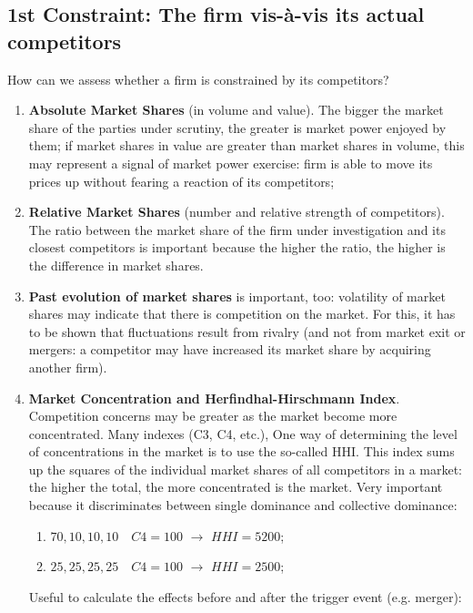     \subsection{1st Constraint: The firm vis-à-vis its actual competitors}

        How can we assess whether a firm is constrained by its competitors?
        \begin{enumerate}
            \item \textbf{Absolute Market Shares} (in volume and value). The bigger the market share of the parties under scrutiny, the greater is market power enjoyed by them; if market shares in value are greater than market shares in volume, this may represent a signal of market power exercise: firm is able to move its prices up without fearing a reaction of its competitors;
            \item \textbf{Relative Market Shares} (number and relative strength of competitors). The ratio between the market share of the firm under investigation and its closest competitors is important because the higher the ratio, the higher is the difference in market shares.
            \item \textbf{Past evolution of market shares} is important, too: volatility of market shares may indicate that there is competition on the market. For this, it has to be shown that fluctuations result from rivalry (and not from market exit or mergers: a competitor may have increased its market share by acquiring another firm).
            \item \textbf{Market Concentration and Herfindhal-Hirschmann Index}. Competition concerns may be greater as the market become more concentrated. Many indexes (C3, C4, etc.), One way of determining the level of concentrations in the market is to use the so-called HHI. This index sums up the squares of the individual market shares of all competitors in a market: the higher the total, the more concentrated is the market. Very important because it discriminates between single dominance and collective dominance:
                \begin{enumerate}
                    \item \(70, 10, 10, 10 \quad  C4 = 100\) \(\rightarrow\) $HHI = 5200$;
                    \item \(25, 25, 25, 25 \quad C4 = 100\) \(\rightarrow\) $HHI = 2500$;
                \end{enumerate}
            Useful to calculate the effects before and after the trigger event (e.g. merger): 

\end{enumerate}
